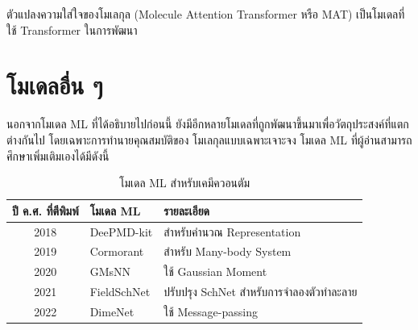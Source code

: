 ตัวแปลงความใส่ใจของโมเลกุล (Molecule Attention Transformer หรือ MAT)\autocite{maziarka2020} เป็นโมเดลที่ใช้ Transformer
ในการพัฒนา

\section{โมเดลอื่น ๆ}
\label{sec:other_ml_qm_models}

นอกจากโมเดล ML ที่ได้อธิบายไปก่อนนี้ ยังมีอีกหลายโมเดลที่ถูกพัฒนาขึ้นมาเพื่อวัตถุประสงค์ที่แตกต่างกันไป โดยเฉพาะการทำนายคุณสมบัติของ%
โมเลกุลแบบเฉพาะเจาะจง โมเดล ML ที่ผู้อ่านสามารถศึกษาเพิ่มเติมเองได้มีดังนี้

\begin{table}[H]
    \centering
    \caption{โมเดล ML สำหรับเคมีควอนตัม}
    \label{tab:ml_qm_model}
    \begin{tabular}{cll}
    \toprule
    \textbf{ปี ค.ศ. ที่ตีพิมพ์} &\textbf{โมเดล ML} &\textbf{รายละเอียด} \\
    \midrule
    2018 &DeePMD-kit\autocite{wang2018} &สำหรับคำนวณ Representation \\
    2019 &Cormorant\autocite{anderson2019} &สำหรับ Many-body System \\
    2020 &GMsNN\autocite{zaverkin2020} &ใช้ Gaussian Moment \\
    2021 &FieldSchNet\autocite{gastegger2021} &ปรับปรุง SchNet สำหรับการจำลองตัวทำละลาย \\
    2022 &DimeNet\autocite{gasteiger2022} &ใช้ Message-passing \\
    \bottomrule
    \end{tabular}
\end{table}
